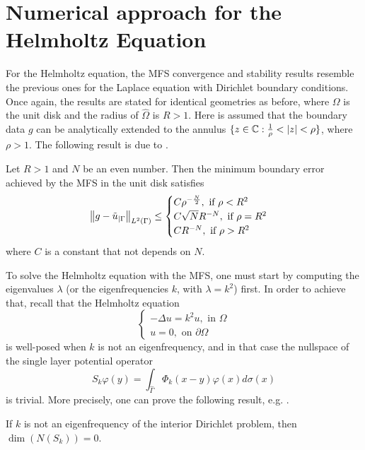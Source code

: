 \section{Numerical approach for the Helmholtz Equation}
For the Helmholtz equation, the \ac{MFS} convergence and stability results resemble the previous ones for the Laplace equation with Dirichlet boundary conditions. Once again, the results are stated for identical geometries as before, where \(\Omega\) is the unit disk and the radius of \(\hat{\Omega}\) is \(R>1\). Here is assumed that the boundary data \(g\) can be analytically extended to the annulus \(\{z \in \mathbb{C}: \frac{1}{\rho}< \abs{z} < \rho\}\), where \(\rho > 1\). The following result is due to \cite{barnett2008stability}.
\begin{theorem}
    Let \(R > 1\) and \(N\) be an even number. Then the minimum boundary error achieved by the \ac{MFS} in the unit disk satisfies
    \[
        \norm{g - \tilde{u}_{|\Gamma}}_{L^2(\Gamma)} \leq 
        \begin{cases}
            C \rho^{-\frac{N}{2}}, \text{ if } \rho < R^2\\
            C \sqrt{N} R^{-N}, \text{ if } \rho = R^2\\
            C R^{-N}, \text{ if } \rho > R^2\\
        \end{cases}
    \]
    where \(C\) is a constant that not depends on \(N\).
\end{theorem}
To solve the Helmholtz equation with the \ac{MFS}, one must start by computing the eigenvalues \(\lambda\) (or the eigenfrequencies \(k\), with \(\lambda = k^2\)) first. In order to achieve that, recall that the Helmholtz equation
\begin{equation}\label{helm_dirichlet}
    \begin{cases}
        -\Delta u = k^2 u, \text{ in } \Omega\\
        u = 0, \text{ on } \partial \Omega
    \end{cases}
\end{equation}
is well-posed when \(k\) is not an eigenfrequency, and in that case the nullspace of the single layer potential operator
\[
    S_k \varphi(y) = \int_{\hat{\Gamma}} \Phi_k(x-y)\varphi(x) d\sigma(x) 
\]
is trivial. More precisely, one can prove the following result, e.g. \cite{alves2005method}.
\begin{theorem}\label{MFS_helm_null_kern}
    If \(k\) is not an eigenfrequency of the interior Dirichlet problem, then \(\dim \left(N(S_k)\right)=0\).
\end{theorem}
